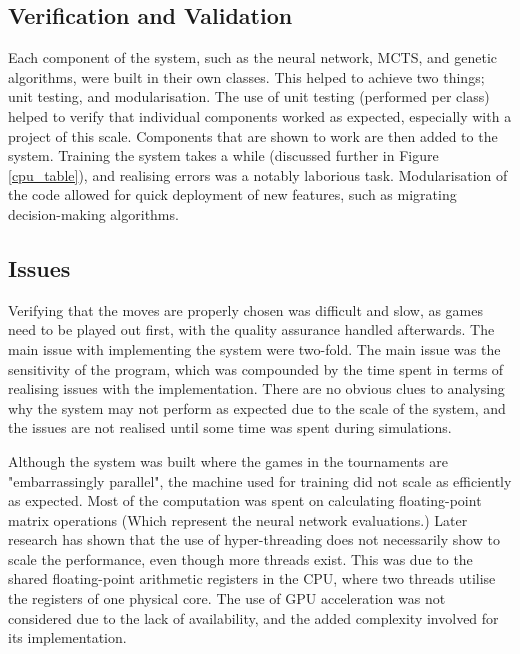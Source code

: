 \documentclass[12pt,a4paper]{article}
\begin{document}
    \subsection{Verification and Validation}

        Each component of the system, such as the neural network, MCTS, and genetic algorithms, were built in their own classes. This helped to achieve two things; unit testing, and modularisation. The use of unit testing (performed per class) helped to verify that individual components worked as expected, especially with a project of this scale. Components that are shown to work are then added to the system. Training the system takes a while (discussed further in Figure \ref{cpu_table}), and realising errors was a notably laborious task. Modularisation of the code allowed for quick deployment of new features, such as migrating decision-making algorithms.


    \subsection{Issues}
        Verifying that the moves are properly chosen was difficult and slow, as games need to be played out first, with the quality assurance handled afterwards. The main issue with implementing the system were two-fold. The main issue was the sensitivity of the program, which was compounded by the time spent in terms of realising issues with the implementation. There are no obvious clues to analysing why the system may not perform as expected due to the scale of the system, and the issues are not realised until some time was spent during simulations. 

        Although the system was built where the games in the tournaments are "embarrassingly parallel", the machine used for training did not scale as efficiently as expected. Most of the computation was spent on calculating floating-point matrix operations (Which represent the neural network evaluations.) Later research has shown that the use of hyper-threading does not necessarily show to scale the performance, even though more threads exist. \cite{leng_empirical_2002} This was due to the shared floating-point arithmetic registers in the CPU, where two threads utilise the registers of one physical core. The use of GPU acceleration was not considered due to the lack of availability, and the added complexity involved for its implementation. 
    
\end{document}
